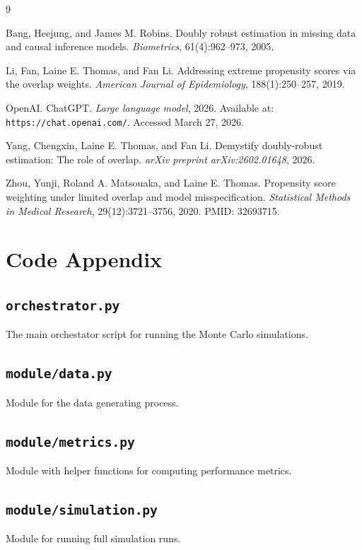 \documentclass[12pt, oneside]{article}   	%
\begin{document}
\newpage
\begin{thebibliography}{9}

Bang, Heejung, and James M. Robins.
\newblock Doubly robust estimation in missing data and causal inference models.
\newblock \emph{Biometrics}, 61(4):962--973, 2005.

Li, Fan, Laine E. Thomas, and Fan Li.
\newblock Addressing extreme propensity scores via the overlap weights.
\newblock \emph{American Journal of Epidemiology}, 188(1):250--257, 2019.

OpenAI.
\newblock ChatGPT.
\newblock \emph{Large language model}, 2026.
\newblock Available at: \texttt{https://chat.openai.com/}. Accessed March 27, 2026.

Yang, Chengxin, Laine E. Thomas, and Fan Li.
\newblock Demystify doubly-robust estimation: The role of overlap.
\newblock \emph{arXiv preprint arXiv:2602.01648}, 2026.

Zhou, Yunji, Roland A. Matsouaka, and Laine E. Thomas.
\newblock Propensity score weighting under limited overlap and model misspecification.
\newblock \emph{Statistical Methods in Medical Research}, 29(12):3721--3756, 2020.
\newblock PMID: 32693715.

\end{thebibliography}
\newpage
\appendix
\section{Code Appendix}

\subsection{\texttt{orchestrator.py}}
The main orchestator script for running the Monte Carlo simulations.


\newpage
\subsection{\texttt{module/data.py}}
Module for the data generating process.


\newpage
\subsection{\texttt{module/metrics.py}}
Module with helper functions for computing performance metrics.


\newpage
\subsection{\texttt{module/simulation.py}}
Module for running full simulation runs.

\end{document}
